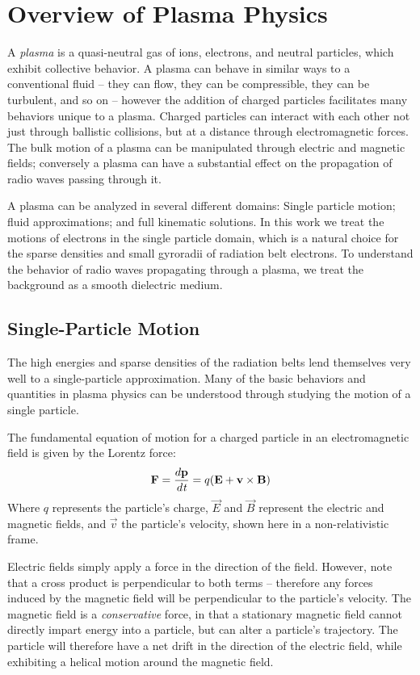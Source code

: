 \section{Overview of Plasma Physics}
A \emph{plasma} is a quasi-neutral gas of ions, electrons, and neutral particles, which exhibit collective behavior. A plasma can behave in similar ways to a conventional fluid -- they can flow, they can be compressible, they can be turbulent, and so on -- however the addition of charged particles facilitates many behaviors unique to a plasma. Charged particles can interact with each other not just through ballistic collisions, but at a distance through electromagnetic forces. The bulk motion of a plasma can be manipulated through electric and magnetic fields; conversely a plasma can have a substantial effect on the propagation of radio waves passing through it. 

A plasma can be analyzed in several different domains: Single particle motion; fluid approximations; and full kinematic solutions. In this work we treat the motions of electrons in the single particle domain, which is a natural choice for the sparse densities and small gyroradii of radiation belt electrons. To understand the behavior of radio waves propagating through a plasma, we treat the background as a smooth dielectric medium. 

\subsection{Single-Particle Motion}
The high energies and sparse densities of the radiation belts lend themselves very well to a single-particle approximation. Many of the basic behaviors and quantities in plasma physics can be understood through studying the motion of a single particle.

The fundamental equation of motion for a charged particle in an electromagnetic field is given by the Lorentz force:
\begin{equation}
\vec{F} = \frac{d\vec{p}}{d\emph{t}} = q(\vec{E} + \vec{v}\times\vec{B})
\label{eqn:lorentz_force}
\end{equation}
Where $q$ represents the particle's charge, $\vec{E}$ and $\vec{B}$ represent the electric and magnetic fields, and $\vec{v}$ the particle's velocity, shown here in a non-relativistic frame.

Electric fields simply apply a force in the direction of the field. However, note that a cross product is perpendicular to both terms -- therefore any forces induced by the magnetic field will be perpendicular to the particle's velocity. The magnetic field is a \emph{conservative} force, in that a stationary magnetic field cannot directly impart energy into a particle, but can alter a particle's trajectory. The particle will therefore have a net drift in the direction of the electric field, while exhibiting a helical motion around the magnetic field.

